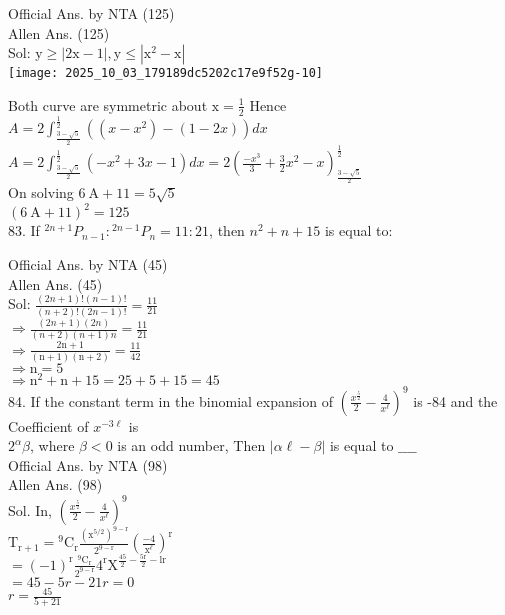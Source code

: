 \documentclass[10pt]{article}
\begin{document}
Official Ans. by NTA (125)\\
Allen Ans. (125)\\
Sol: \(\mathrm{y} \geq|2 \mathrm{x}-1|, \mathrm{y} \leq\left|\mathrm{x}^{2}-\mathrm{x}\right|\)\\
\texttt{[image: 2025\_10\_03\_179189dc5202c17e9f52g-10]}

Both curve are symmetric about \(\mathrm{x}=\frac{1}{2}\) Hence\\
\(A=2 \int_{\frac{3-\sqrt{5}}{2}}^{\frac{1}{2}}\left(\left(x-x^{2}\right)-(1-2 x)\right) d x\)\\
\(A=2 \int_{\frac{3-\sqrt{5}}{2}}^{\frac{1}{2}}\left(-x^{2}+3 x-1\right) d x=2\left(\frac{-x^{3}}{3}+\frac{3}{2} x^{2}-x\right)_{\frac{3-\sqrt{5}}{2}}^{\frac{1}{2}}\)\\
On solving \(6 \mathrm{~A}+11=5 \sqrt{5}\)\\
\((6 \mathrm{~A}+11)^{2}=125\)\\
83. If \({ }^{2 n+1} P_{n-1}:{ }^{2 n-1} P_{n}=11: 21\), then \(n^{2}+n+15\) is equal to:

Official Ans. by NTA (45)\\
Allen Ans. (45)\\
Sol: \(\frac{(2 n+1)!(n-1)!}{(n+2)!(2 n-1)!}=\frac{11}{21}\)\\
\(\Rightarrow \frac{(2 n+1)(2 n)}{(n+2)(n+1) n}=\frac{11}{21}\)\\
\(\Rightarrow \frac{2 \mathrm{n}+1}{(\mathrm{n}+1)(\mathrm{n}+2)}=\frac{11}{42}\)\\
\(\Rightarrow \mathrm{n}=5\)\\
\(\Rightarrow \mathrm{n}^{2}+\mathrm{n}+15=25+5+15=45\)\\
84. If the constant term in the binomial expansion of \(\left(\frac{x^{\frac{5}{2}}}{2}-\frac{4}{x^{\ell}}\right)^{9}\) is -84 and the Coefficient of \(x^{-3 \ell}\) is\\
\(2^{\alpha} \beta\), where \(\beta<0\) is an odd number, Then \(|\alpha \ell-\beta|\) is equal to \(\_\_\_\_\)\\
Official Ans. by NTA (98)\\
Allen Ans. (98)\\
Sol. In, \(\left(\frac{x^{\frac{5}{2}}}{2}-\frac{4}{x^{\ell}}\right)^{9}\)\\
\(\mathrm{T}_{\mathrm{r}+1}={ }^{9} \mathrm{C}_{\mathrm{r}} \frac{\left(\mathrm{x}^{5 / 2}\right)^{9-\mathrm{r}}}{2^{9-\mathrm{r}}}\left(\frac{-4}{\mathrm{x}^{\ell}}\right)^{\mathrm{r}}\)\\
\(=(-1)^{\mathrm{r}} \frac{{ }^{9} \mathrm{C}_{\mathrm{r}}}{2^{9-\mathrm{r}}} 4^{\mathrm{r}} \mathrm{X}^{\frac{45}{2}-\frac{5 \mathrm{r}}{2}-\mathrm{lr}}\)\\
\(=45-5 r-21 r=0\)\\
\(r=\frac{45}{5+21}\)
\end{document}

